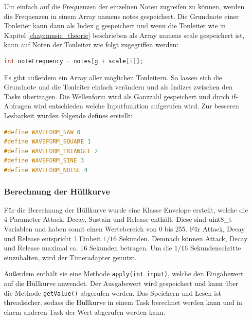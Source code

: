 Um einfach auf die Frequenzen der einzelnen Noten zugreifen zu können,
werden die Frequenzen in einem Array namens notes gespeichert. Die Grundnote einer
Tonleiter kann dann als Index g gespeichert und wenn die Tonleiter wie 
in Kapitel \ref{chap:music_theorie} beschrieben als Array namens scale gespeichert ist,
kann auf Noten der Tonleiter wie folgt zugegriffen werden:
\begin{lstlisting}[language=C++,
                   frame=single,
                   caption={Zugriff auf die Frequenzen der Noten einer Tonleiter},
                   captionpos=b]
int noteFrequency = notes[g + scale[i]];
\end{lstlisting}

Es gibt außerdem ein Array aller möglichen Tonleitern.
So lassen sich die Grundnote und die Tonleiter einfach verändern und als Indizes 
zwischen den Tasks übertragen.
Die Wellenform wird als Ganzzahl gespeichert und durch if-Abfragen wird
entschieden welche Inputfunktion aufgerufen wird.
Zur besseren Lesbarkeit wurden folgende defines erstellt:

\begin{lstlisting}[language=C++,
                   frame=single,
                   caption={Defines für die Wellenformen},
                   captionpos=b]
#define WAVEFORM_SAW 0
#define WAVEFORM_SQUARE 1
#define WAVEFORM_TRIANGLE 2
#define WAVEFORM_SINE 3
#define WAVEFORM_NOISE 4
\end{lstlisting}

\subsubsection{Berechnung der Hüllkurve}
\label{chap:envelope_calculation}

Für die Berechnung der Hüllkurve wurde eine Klasse Envelope erstellt, 
welche die 4 Parameter Attack, Decay, Sustain und Release enthält.
Diese sind uint8\_t Variablen und haben somit einen Wertebereich von 0 bis 255.
Für Attack, Decay und Release entspricht 1 Einheit $1/16$ Sekunden. 
Demnach können Attack, Decay und Release maximal ca. 16 Sekunden betragen.
Um die $1/16$ Sekundenschritte einzuhalten, wird der Timeradapter genutzt.

Außerdem enthält sie eine Methode \lstinline{apply(int input)},
welche den Eingabewert auf die Hüllkurve anwendet.
Der Ausgabewert wird gespeichert und kann über die Methode \lstinline{getValue()}
abgerufen werden. Das Speichern und Lesen ist threadsicher, sodass die Hüllkurve
in einem Task berechnet werden kann und in einem anderen Task der Wert abgerufen 
werden kann.

